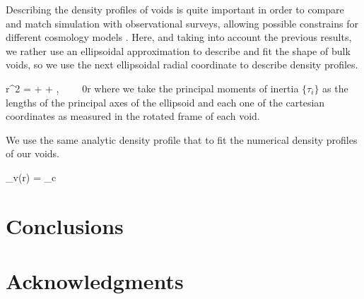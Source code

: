 \documentclass[a4,useAMS,usenatbib,usegraphicx]{latex/mn2e}
\begin{document}
Describing the density profiles of voids is quite important in order to 
compare and match simulation with observational surveys, allowing possible
constrains for different cosmology models \SRKED{[Hamaous, et.al 2014]}. 
Here, and taking into account the previous results, we rather use an 
ellipsoidal approximation to describe and fit the shape of bulk voids, so 
we use the next ellipsoidal radial coordinate to describe density profiles.


{
r^2 =  +  + ,
\ \ \ \ 0\leq r 
}
where we take the principal moments of inertia $\{\tau_i \}$ as the 
lengths of the principal axes of the ellipsoid and each one of the 
cartesian coordinates as measured in the rotated frame of each void.


We use the same analytic density profile that \SRKED{[Hamaous, et.al 2014]} 
to fit the numerical density profiles of our voids.


{
\delta_v(r) = \delta_c
}



\section{Conclusions}
\label{sec:conclusions}


\section*{Acknowledgments}  




\end{document}
